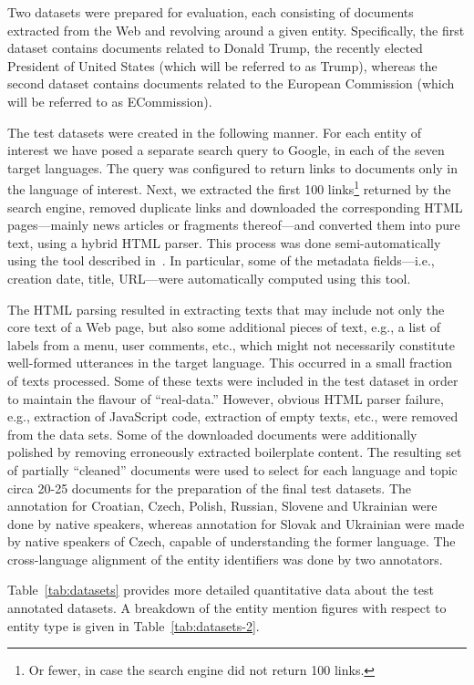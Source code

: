 \documentclass[11pt]{article}
\begin{document}
Two datasets were prepared for evaluation, each consisting of documents
extracted from the Web and revolving around a given entity.
Specifically, the first dataset contains documents related to Donald
Trump, the recently elected President of United States (which will be
referred to as {\sc Trump}), whereas the second dataset contains
documents related to the European Commission (which will be referred to
as {\sc ECommission}).

The test datasets were created in the following manner.  For each entity
of interest we have posed a separate search query to Google, in each of
the seven target languages.  The query was configured to return links to
documents only in the language of interest.  Next, we extracted the first
100 links\footnote{Or fewer, in case the search engine did not return 100
  links.} returned by the search engine, removed duplicate links and
downloaded the corresponding HTML pages---mainly news articles or
fragments thereof---and converted them into pure text, using a hybrid
HTML parser.  This process was done semi-automatically using the tool
described in~\cite{Crawley:ea:2010}.  In particular, some of the metadata
fields---i.e., creation date, title, URL---were automatically computed
using this tool.


The HTML parsing resulted in extracting texts that may include not only
the core text of a Web page, but also some additional pieces of text,
e.g., a list of labels from a menu, user comments, etc., which might not
necessarily constitute well-formed utterances in the target language.
This occurred in a small fraction of texts processed.  Some of
these texts were included in the test dataset in order to maintain the
flavour of ``real-data.''  However, obvious HTML parser failure, e.g.,
extraction of JavaScript code, extraction of empty texts, etc., were removed
from the data sets.  Some of the downloaded documents were
additionally polished by removing erroneously extracted boilerplate
content.  The resulting set of partially ``cleaned'' documents were used to
select for each language and topic circa 20-25 documents for the
preparation of the final test datasets. The annotation for Croatian,
Czech, Polish, Russian, Slovene and Ukrainian were done by native speakers, whereas
annotation for Slovak and Ukrainian were made by native speakers of Czech, capable 
of understanding the former language. The cross-language alignment of the entity identifiers was
done by two annotators. 

Table~\ref{tab:datasets} provides more detailed quantitative data about the test annotated datasets. A breakdown 
of the entity mention figures with respect to entity type is given in Table~\ref{tab:datasets-2}. 
\end{document}
